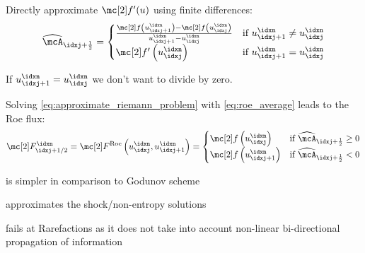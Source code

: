 \begin{defnbox}\nospacing
    \begin{defn}\label{defn:roe_average}
        Directly approximate $\flux'(u)$ using finite differences:
       \begin{align}
         \widehat{\mcA}_{\idxj+\frac{1}{2}}=
         \begin{cases}
             \frac{\flux\left(u^{\idxn}_{\idxj+1}\right)-\flux\left(u^{\idxn}_{\idxj}\right)}{u^{\idxn}_{\idxj+1}-u^{\idxn}_{\idxj}}&
             \text{if }u^{\idxn}_{\idxj+1}\neq u^{\idxn}_{\idxj} \\
             \flux'\left(u^{\idxn}_{\idxj}\right)&\text{if }u^{\idxn}_{\idxj+1}=u^{\idxn}_{\idxj}
         \end{cases}
       \end{align}
    \end{defn}
\end{defnbox}
\begin{explanationbox}\nospacing
    \begin{explanation}
        If $u^{\idxn}_{\idxj+1}=u^{\idxn}_{\idxj}$ we don't want to divide by zero.
    \end{explanation}
\end{explanationbox}
\begin{corbox}\nospacing
    \begin{cor}\label{cor:roe_flux}
        Solving \cref{eq:approximate_riemann_problem} with \cref{eq:roe_average} leads to the Roe flux:
        \begin{align}
          \Flux_{\idxj+1/2}^{\idxn}=\Flux^{\text{Roe}}\left(u^{\idxn}_{\idxj},u^{\idxn}_{\idxj+1}\right)=
          \begin{cases}
              \flux\left(u_{\idxj}^{\idxn}\right)&\text{if }\widehat{\mcA}_{\idxj+\frac{1}{2}}\geq0 \\
              \flux\left(u_{\idxj+1}^{\idxn}\right)&\text{if }\widehat{\mcA}_{\idxj+\frac{1}{2}}<0 \\
          \end{cases}
        \end{align}
    \end{cor}
\end{corbox}
\begin{sectionbox}\nospacing
    \begin{minipage}{0.45\textwidth}
       \begin{proslist}
           \item is simpler in comparison to Godunov scheme
           \item approximates the shock/non-entropy solutions
       \end{proslist} 
    \end{minipage}\hfil
    \begin{minipage}{0.5\textwidth}
       \begin{conslist}
           \item fails at Rarefactions as it does not take into account non-linear bi-directional propagation of information
       \end{conslist} 
    \end{minipage}
\end{sectionbox}


